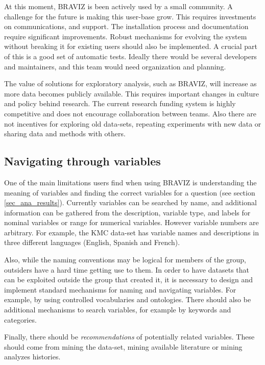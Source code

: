 At this moment, BRAVIZ is been actively used by a small community. A challenge for the future is making this user-base grow. This requires investments on communications, and support. The installation process and documentation require significant improvements. Robust mechanisms for evolving the system without breaking it for existing users should also be implemented. A crucial part of this is a good set of automatic tests. Ideally there would be several developers and maintainers, and this team would need organization and planning.

The value of solutions for exploratory analysis, such as BRAVIZ, will increase as more data becomes publicly available. This requires important changes in  culture and policy behind research. The current research funding system is highly competitive and does not encourage collaboration between teams. Also there are not incentives for exploring old data-sets, repeating experiments with new data or sharing data and methods with others. 

\subsection{Navigating through variables}

One of the main limitations users find when using BRAVIZ is understanding the meaning of variables and finding the correct variables for a question (see section \ref{sec_ana_results}). Currently variables can be searched by name, and additional information can be gathered from the description, variable type, and labels for nominal variables or range for numerical variables. However variable numbers are arbitrary. For example, the KMC data-set has variable names and descriptions in three different languages (English, Spanish and French). 

Also, while the naming conventions may be logical for members of the group, outsiders have a hard time getting use to them. In order to have datasets that can be exploited outside the group  that created it, it is necessary to design and implement standard mechanisms for naming and navigating variables. For example, by using controlled vocabularies and ontologies. There should also be additional mechanisms to search variables, for example by keywords and categories.

Finally, there should be \emph{recommendations} of potentially related variables. These should come from mining the data-set, mining available literature or mining analyzes histories.

